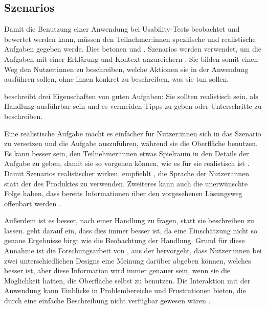 \subsection{Szenarios}
\label{sec:scenarios}

Damit die Benutzung einer Anwendung bei Usability-Tests beobachtet und bewertet werden kann, müssen den Teilnehmer:innen spezifische und realistische Aufgaben gegeben werde. Dies betonen \textcite{mccloskeyTaskScenarios2014} und \textcite{barnumUsabilityTesting2021}. Szenarios werden verwendet, um die Aufgaben mit einer Erklärung und Kontext anzureichern \parencite{mccloskeyTaskScenarios2014}. Sie bilden somit einen Weg den Nutzer:innen zu beschreiben, welche Aktionen sie in der Anwendung ausführen sollen, ohne ihnen konkret zu beschreiben, was sie tun sollen.

\textcite{mccloskeyTaskScenarios2014} beschreibt drei Eigenschaften von guten Aufgaben: Sie sollten realistisch sein, als Handlung ausführbar sein und es vermeiden Tipps zu geben oder Unterschritte zu beschreiben.

Eine realistische Aufgabe macht es einfacher für Nutzer:innen sich in das Szenario zu versetzen und die Aufgabe auszuführen, während sie die Oberfläche benutzen. Es kann besser sein, den Teilnehmer:innen etwas Spielraum in den Details der Aufgabe zu geben, damit sie so vorgehen können, wie es für sie realistisch ist \parencite{mccloskeyTaskScenarios2014}. Damit Szenarios realistischer wirken, empfiehlt \textcite{barnumUsabilityTesting2021}, die Sprache der Nutzer:innen statt der des Produktes zu verwenden. Zweiteres kann auch die unerwünschte Folge haben, dass bereits Informationen über den vorgesehenen Lösungsweg offenbart werden \parencite{barnumUsabilityTesting2021}.

Außerdem ist es besser, nach einer Handlung zu fragen, statt sie beschreiben zu lassen. \textcite{nielsenFirstRule2001} geht darauf ein, dass dies immer besser ist, da eine Einschätzung nicht so genaue Ergebnisse birgt wie die Beobachtung der Handlung. Grund für diese Annahme ist die Forschungsarbeit von \textcite{nielsenMeasuringUsability1994}, aus der hervorgeht, dass Nutzer:innen bei zwei unterschiedlichen Designs eine Meinung darüber abgeben können, welches besser ist, aber diese Information wird immer genauer sein, wenn sie die Möglichkeit hatten, die Oberfläche selbst zu benutzen. Die Interaktion mit der Anwendung kann Einblicke in Problembereiche und Frustrationen bieten, die durch eine einfache Beschreibung nicht verfügbar gewesen wären \parencite{mccloskeyTaskScenarios2014}.

